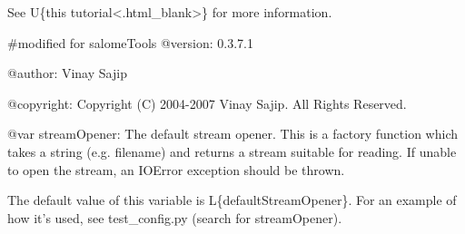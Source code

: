 \documentclass[a4paper,10pt,english]{sphinxmanual}
\begin{document}
See U\{this tutorial\textless{}.html\textbar{}\_blank\textgreater{}\} for more
information.

\#modified for salomeTools
@version: 0.3.7.1

@author: Vinay Sajip

@copyright: Copyright (C) 2004-2007 Vinay Sajip. All Rights Reserved.

@var streamOpener: The default stream opener. This is a factory function which
takes a string (e.g. filename) and returns a stream suitable for reading. If
unable to open the stream, an IOError exception should be thrown.

The default value of this variable is L\{defaultStreamOpener\}. For an example
of how it’s used, see test\_config.py (search for streamOpener).
\end{document}

